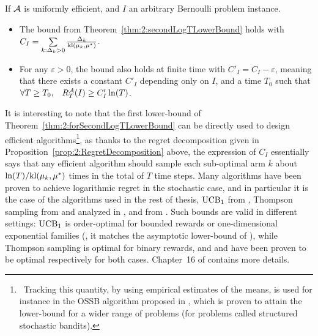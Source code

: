 \begin{theorem}\label{thm:2:forSecondLogTLowerBound}
\begin{leftbarnospace}[theorembar]  %
    If $\mathcal{A}$ is uniformly efficient,
    and $I$ an arbitrary Bernoulli problem instance.
    \begin{itemize}
        \item
        The bound from Theorem~\ref{thm:2:secondLogTLowerBound} holds with
            $C_I = \sum\limits_{k: \Delta_k > 0} \frac{\Delta_k}{\mathrm{kl}(\mu_k, \mu^*)}$.
        \item
        For any $\varepsilon>0$, the bound also holds at finite time with
            $C'_I = C_I - \varepsilon$,
        meaning that there exists a constant $C'_I$ depending only on $I$,
        and a time $T_0$ such that $\forall T \geq T_0, \;\;\; R_T^{\mathcal{A}}(I) \geq C'_I \ln(T)$.
    \end{itemize}
\end{leftbarnospace}  %
\end{theorem}

It is interesting to note that the first lower-bound of Theorem~\ref{thm:2:forSecondLogTLowerBound} can be directly used to design efficient algorithms\footnote{~Tracking this quantity, by using empirical estimates of the means, is used for instance in the OSSB algorithm proposed in \cite{Combes17}, which is proven to attain the lower-bound for a wider range of problems (for problems called structured stochastic bandits).}, as thanks to the regret decomposition given in Proposition~\ref{prop:2:RegretDecomposition} above, the expression of $C_I$ essentially says that any efficient algorithm
should sample each sub-optimal arm $k$ about $\ln(T)/\mathrm{kl}(\mu_k,\mu^*)$ times in the total of $T$ time steps.
%
Many algorithms have been proven to achieve logarithmic regret in the stochastic case,
and in particular it is the case of the algorithms used in the rest of thesis, $\mathrm{UCB}_1$ from \cite{Auer02}, Thompson sampling from \cite{Thompson33} and analyzed in \cite{AgrawalGoyal11,Kaufmann12Thompson}, and \klUCB{} from \cite{Garivier11KL,KLUCBJournal}.
%
Such bounds are valid in different settings:
$\mathrm{UCB}_1$ is order-optimal for bounded rewards or one-dimensional exponential families (\ie, it matches the asymptotic lower-bound of \cite{LaiRobbins85}),
while Thompson sampling is optimal for binary rewards, and \klUCB{} and \KLUCB{} have been proven to be optimal respectively for both cases.
%
Chapter~16 of \cite{LattimoreBanditAlgorithmsBook} contains more details.


